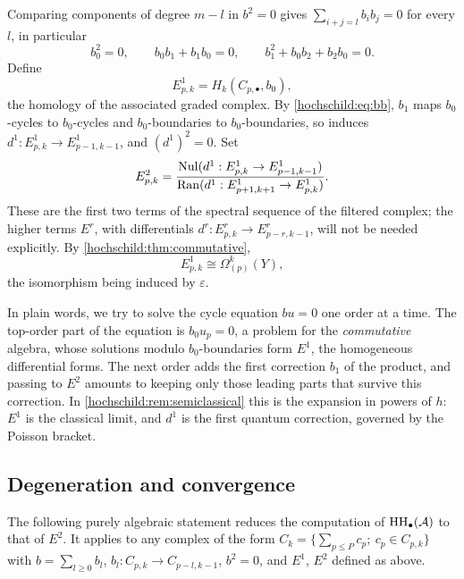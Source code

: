 Comparing components of degree $m-l$ in $b^2=0$ gives
$\sum_{i+j=l}b_ib_j=0$ for every $l$, in particular
\begin{equation}
  b_0^2=0,\qquad b_0b_1+b_1b_0=0,\qquad b_1^2+b_0b_2+b_2b_0=0 .
  \label{hochschild:eq:bb}
\end{equation}
Define
\begin{equation*}
  E^1_{p,k}=H_k(C_{p,\bullet},b_0),
\end{equation*}
the homology of the associated graded complex. By \eqref{hochschild:eq:bb},
$b_1$ maps $b_0$-cycles to $b_0$-cycles and $b_0$-boundaries to
$b_0$-boundaries, so induces $d^1:E^1_{p,k}\to E^1_{p-1,k-1}$, and
$(d^1)^2=0$. Set
\begin{equation*}
  E^2_{p,k}=\frac{\operatorname{Nul}(d^1:E^1_{p,k}\to E^1_{p-1,k-1})}{\operatorname{Ran}(d^1:E^1_{p+1,k+1}\to E^1_{p,k})}.
\end{equation*}
These are the first two terms of the spectral sequence of the filtered
complex; the higher terms $E^r$, with differentials
$d^r:E^r_{p,k}\to E^r_{p-r,k-1}$, will not be needed explicitly. By
\cref{hochschild:thm:commutative},
\begin{equation}
  E^1_{p,k}\cong\Omega^k_{(p)}(Y),
  \label{hochschild:eq:E1}
\end{equation}
the isomorphism being induced by $\varepsilon$.

\begin{discussion}
In plain words, we try to solve the cycle equation $bu=0$ one order at a
time. The top-order part of the equation is $b_0u_p=0$, a problem for the
\emph{commutative} algebra, whose solutions modulo $b_0$-boundaries form
$E^1$, the homogeneous differential forms. The next order adds the first
correction $b_1$ of the product, and passing to $E^2$ amounts to keeping only
those leading parts that survive this correction. In
\cref{hochschild:rem:semiclassical} this is the expansion in powers of
$h$: $E^1$ is the classical limit, and $d^1$ is the first quantum
correction, governed by the Poisson bracket.
\end{discussion}

\subsection{Degeneration and convergence}
The following purely algebraic statement reduces the computation of
$\operatorname{HH}_\bullet(\mathcal{A})$ to that of $E^2$. It applies to any complex of the form
$C_k=\{\sum_{p\le P}c_p;\ c_p\in C_{p,k}\}$ with $b=\sum_{l\ge0}b_l$,
$b_l:C_{p,k}\to C_{p-l,k-1}$, $b^2=0$, and $E^1$, $E^2$ defined as above.

